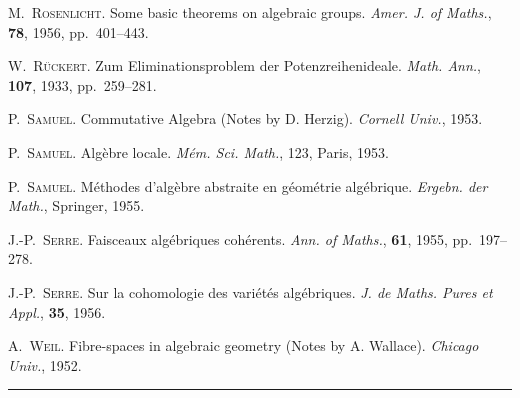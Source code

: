 \begin{enumerate}[label={[\arabic*]},leftmargin=3em]
\item{} M.~\textsc{Rosenlicht}. Some basic theorems on algebraic groups.
\emph{Amer. J. of Maths.}, \textbf{78}, 1956, pp.~401--443.

\item{} W.~\textsc{Rückert}. Zum Eliminationsproblem der Potenzreihenideale.
\emph{Math. Ann.}, \textbf{107}, 1933, pp.~259--281.

\item{} P.~\textsc{Samuel}. Commutative Algebra (Notes by D. Herzig).
\emph{Cornell Univ.}, 1953.

\item{} P.~\textsc{Samuel}. Algèbre locale. \emph{Mém. Sci. Math.}, 123,
Paris, 1953.

\item{} P.~\textsc{Samuel}. Méthodes d'algèbre abstraite en géométrie
algébrique. \emph{Ergebn. der Math.}, Springer, 1955.

\item{} J.-P.~\textsc{Serre}. Faisceaux algébriques cohérents.
\emph{Ann. of Maths.}, \textbf{61}, 1955, pp.~197--278.

\item{} J.-P.~\textsc{Serre}. Sur la cohomologie des variétés algébriques.
\emph{J. de Maths. Pures et Appl.}, \textbf{35}, 1956.

\item{} A.~\textsc{Weil}. Fibre-spaces in algebraic geometry (Notes by
A. Wallace). \emph{Chicago Univ.}, 1952.
\end{enumerate}

\begin{center}\rule{4cm}{0.4pt}\end{center}
